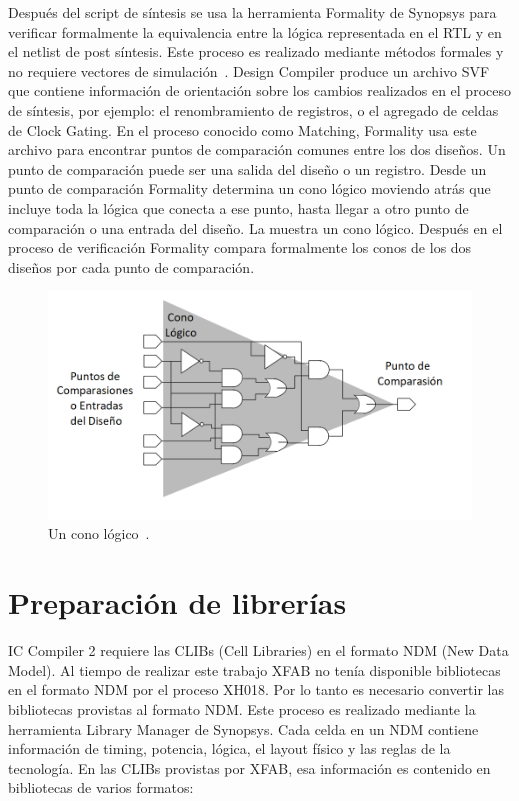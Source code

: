 \documentclass[a4paper, twoside, 11pt]{report}
\begin{document}
Después del script de síntesis se usa la herramienta Formality de Synopsys para verificar formalmente la equivalencia entre la lógica representada en el RTL y en el netlist de post síntesis. Este proceso es realizado mediante métodos formales y no requiere vectores de simulación~\cite[traducido de][]{formality_ug}. Design Compiler produce un archivo SVF que contiene información de orientación sobre los cambios realizados en el proceso de síntesis, por ejemplo: el renombramiento de registros, o el agregado de celdas de Clock Gating. En el proceso conocido como Matching, Formality usa este archivo para encontrar puntos de comparación comunes entre los dos diseños. Un punto de comparación puede ser una salida del diseño o un registro. Desde un punto de comparación Formality determina un cono lógico moviendo atrás que incluye toda la lógica que conecta a ese punto, hasta llegar a otro punto de comparación o una entrada del diseño. La  muestra un cono lógico. Después en el proceso de verificación Formality compara formalmente los conos de los dos diseños por cada punto de comparación.

\begin{figure}[htb]
  \centering
  \includegraphics[width=1.0\textwidth]{./img/logic_cones}
  \caption{Un cono lógico~\cite[Adaptado de][]{formality_ug}.}
  \label{fig:logic_cones}
\end{figure}

\FloatBarrier
\section{Preparación de librerías}

IC Compiler 2 requiere las CLIBs (Cell Libraries) en el formato NDM (New Data Model). Al tiempo de realizar este trabajo XFAB no tenía disponible bibliotecas en el formato NDM por el proceso XH018. Por lo tanto es necesario convertir las bibliotecas provistas al formato NDM. Este proceso es realizado mediante la herramienta Library Manager de Synopsys. Cada celda en un NDM contiene información de timing, potencia, lógica, el layout físico y las reglas de la tecnología. En las CLIBs provistas por XFAB, esa información es contenido en bibliotecas de varios formatos:
\end{document}
